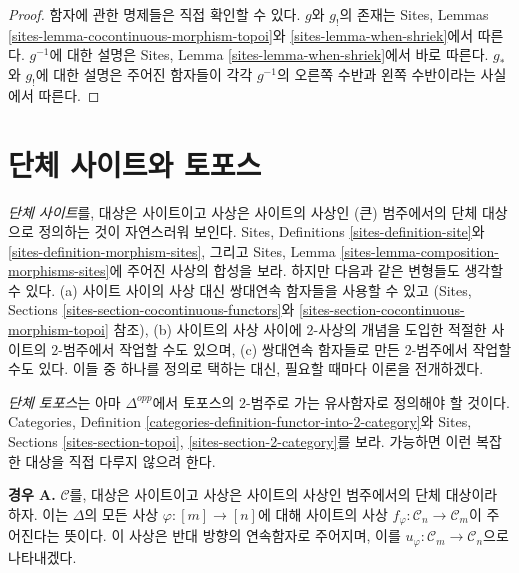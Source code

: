 \begin{proof}
함자에 관한 명제들은 직접 확인할 수 있다.
$g$와 $g_!$의 존재는 Sites, Lemmas
\ref{sites-lemma-cocontinuous-morphism-topoi}와
\ref{sites-lemma-when-shriek}에서 따른다.
$g^{-1}$에 대한 설명은 Sites, Lemma
\ref{sites-lemma-when-shriek}에서 바로 따른다.
$g_*$와 $g_!$에 대한 설명은 주어진 함자들이 각각
$g^{-1}$의 오른쪽 수반과 왼쪽 수반이라는 사실에서 따른다.
\end{proof}






\section{단체 사이트와 토포스}
\label{section-simplicial-sites}

\noindent
{\it 단체 사이트}를, 대상은 사이트이고 사상은 사이트의 사상인
(큰) 범주에서의 단체 대상으로 정의하는 것이 자연스러워 보인다.
Sites, Definitions \ref{sites-definition-site}와
\ref{sites-definition-morphism-sites}, 그리고 Sites, Lemma
\ref{sites-lemma-composition-morphisms-sites}에 주어진 사상의 합성을 보라.
하지만 다음과 같은 변형들도 생각할 수 있다.
(a) 사이트 사이의 사상 대신 쌍대연속 함자들을 사용할 수 있고
(Sites, Sections \ref{sites-section-cocontinuous-functors}와
\ref{sites-section-cocontinuous-morphism-topoi} 참조),
(b) 사이트의 사상 사이에 $2$-사상의 개념을 도입한 적절한
사이트의 $2$-범주에서 작업할 수도 있으며,
(c) 쌍대연속 함자들로 만든 $2$-범주에서 작업할 수도 있다.
이들 중 하나를 정의로 택하는 대신, 필요할 때마다 이론을 전개하겠다.

\medskip\noindent
{\it 단체 토포스}는 아마 $\Delta^{opp}$에서 토포스의 $2$-범주로 가는
유사함자로 정의해야 할 것이다. Categories, Definition
\ref{categories-definition-functor-into-2-category}와 Sites, Sections
\ref{sites-section-topoi}, \ref{sites-section-2-category}를 보라.
가능하면 이런 복잡한 대상을 직접 다루지 않으려 한다.

\medskip\noindent
{\bf 경우 A.}
$\mathcal{C}$를, 대상은 사이트이고 사상은 사이트의 사상인 범주에서의
단체 대상이라 하자. 이는 $\Delta$의 모든 사상
$\varphi : [m] \to [n]$에 대해 사이트의 사상
$f_\varphi : \mathcal{C}_n \to \mathcal{C}_m$이 주어진다는 뜻이다.
이 사상은 반대 방향의 연속함자로 주어지며, 이를
$u_\varphi : \mathcal{C}_m \to \mathcal{C}_n$으로 나타내겠다.

